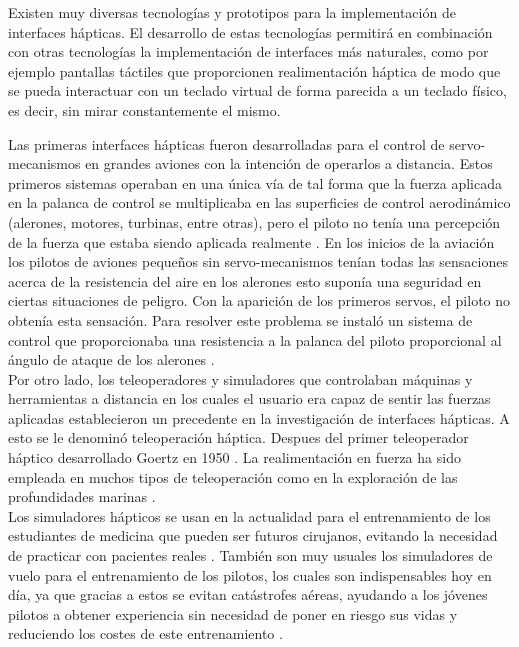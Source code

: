Existen muy diversas tecnologías y prototipos para la implementación de interfaces hápticas. El desarrollo de estas tecnologías permitirá en combinación con otras tecnologías la implementación de interfaces más naturales, como por ejemplo pantallas táctiles que proporcionen realimentación háptica  de modo que se pueda interactuar con un teclado virtual de forma parecida a  un teclado físico, es decir, sin mirar constantemente el mismo.


Las primeras interfaces hápticas fueron desarrolladas  para el control de servo-mecanismos en grandes aviones con la intención de operarlos a distancia. Estos primeros sistemas  operaban en una única vía de tal forma que la fuerza aplicada en la palanca de control se multiplicaba en las superficies de control aerodinámico (alerones, motores, turbinas, entre otras), pero el piloto no tenía una percepción de la fuerza que estaba siendo aplicada realmente \cite{abel2010pilot,abel2007pilot}. En los inicios de la aviación los pilotos de aviones pequeños sin servo-mecanismos tenían todas las sensaciones acerca de la resistencia del aire en los alerones esto suponía una seguridad en ciertas situaciones de peligro. Con la aparición de los primeros servos, el piloto no obtenía esta sensación. Para resolver este problema se instaló un sistema de control que proporcionaba una resistencia a la  palanca del piloto proporcional al ángulo de ataque de los alerones \cite{troy2011systems,stigter2007design,hanlon2011active}.\\


Por otro lado, los teleoperadores y simuladores que controlaban máquinas y herramientas a distancia  en los cuales el usuario era capaz de sentir las fuerzas aplicadas establecieron un precedente en la investigación de interfaces hápticas. A esto se le denominó teleoperación háptica. Despues del primer  teleoperador háptico desarrollado Goertz en 1950 \cite{goertz1961manipulator,goertz1954electrical,goertz1954mechanical,goertz1952fundamentals}. La realimentaci\'on en fuerza ha sido empleada en muchos tipos de teleoperación como en la exploración de las profundidades marinas \cite{domingues2012human}.\\



Los simuladores hápticos se usan en la actualidad para el entrenamiento de los estudiantes de medicina que pueden ser futuros cirujanos, evitando la necesidad de practicar con pacientes reales \cite{sun,waldron}. También son muy usuales los simuladores de vuelo  para el entrenamiento de los pilotos, los cuales son indispensables hoy en día, ya que gracias a estos se evitan catástrofes aéreas, ayudando a los jóvenes pilotos a obtener experiencia sin necesidad de poner en riesgo sus vidas y reduciendo los costes de este entrenamiento \cite{lam1983flight}.\\ 


